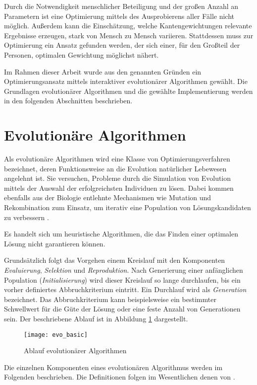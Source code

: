 Durch die Notwendigkeit menschlicher Beteiligung und der großen Anzahl an Parametern ist eine Optimierung mittels des Ausprobierens aller Fälle nicht möglich. Außerdem kann die Einschätzung, welche Kantengewichtungen relevante Ergebnisse erzeugen, stark von Mensch zu Mensch variieren. Stattdessen muss zur Optimierung ein Ansatz gefunden werden, der sich einer, für den Großteil der Personen, optimalen Gewichtung möglichst nähert. 

Im Rahmen dieser Arbeit wurde aus den genannten Gründen ein Optimierungsansatz mittels interaktiver evolutionärer Algorithmen gewählt. Die Grundlagen evolutionärer Algorithmen und die gewählte Implementierung werden in den folgenden Abschnitten beschrieben.

\section{Evolutionäre Algorithmen}
\label{evo}

Als evolutionäre Algorithmen wird eine Klasse von Optimierungsverfahren bezeichnet, deren Funktionsweise an die Evolution natürlicher Lebewesen angelehnt ist. Sie versuchen, Probleme durch die Simulation von Evolution mittels der Auswahl der erfolgreichsten Individuen zu lösen. Dabei kommen ebenfalls aus der Biologie entlehnte Mechanismen wie Mutation und Rekombination zum Einsatz, um iterativ eine Population von Lösungskandidaten zu verbessern \cite{tw2008}.

Es handelt sich um heuristische Algorithmen, die das Finden einer optimalen Lösung nicht garantieren können.

Grundsätzlich folgt das Vorgehen einem Kreislauf mit den Komponenten \emph{Evaluierung}, \emph{Selektion} und \emph{Reproduktion}. Nach Generierung einer anfänglichen Population (\emph{Initialisierung}) wird dieser Kreislauf so lange durchlaufen, bis ein vorher definiertes Abbruchkriterium eintritt. Ein Durchlauf wird als \emph{Generation} bezeichnet. Das Abbruchkriterium kann beispielsweise ein bestimmter Schwellwert für die Güte der Lösung oder eine feste Anzahl von Generationen sein. Der beschriebene Ablauf ist in Abbildung \ref{fig:evo_basic} dargestellt.

\begin{figure}
\centering
\texttt{[image: evo\_basic]}
\caption{Ablauf evolutionärer Algorithmen}
\label{fig:evo_basic}
\end{figure}

Die einzelnen Komponenten eines evolutionären Algorithmus werden im Folgenden beschrieben. Die Definitionen folgen im Wesentlichen denen von \textcite{tw2008}.

